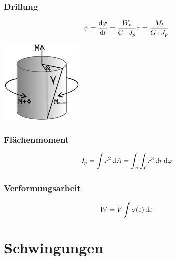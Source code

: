 \subsubsection*{Drillung}
\begin{multicols}{2}{}
\begin{align*}
\psi&=\frac{\mathop{}\!\mathrm{d} \varphi}{\mathop{}\!\mathrm{d} l}=\frac{W_t}{G\cdot J_p}\tau=\frac{M_t}{G\cdot J_p}
\end{align*}
\hfill

\begin{center}
 \includegraphics[width=40mm,height=40mm,keepaspectratio=true]{./Physik/Bilder/Scherbeanspruchung.png}
\end{center}
\end{multicols}


\begin{multicols}{2}{}
\subsubsection*{Flächenmoment}
\begin{align*}
J_p&=\int r^2\mathop{}\!\mathrm{d} A=\int_\varphi\int_r r^3\mathop{}\!\mathrm{d} r \mathop{}\!\mathrm{d} \varphi 
\end{align*}


\subsubsection*{Verformungsarbeit}
\begin{align*}
W&=V\int \sigma(\varepsilon) \mathop{}\!\mathrm{d} \varepsilon 
\end{align*}
\end{multicols}


\section{Schwingungen}
\subsection*{}%

